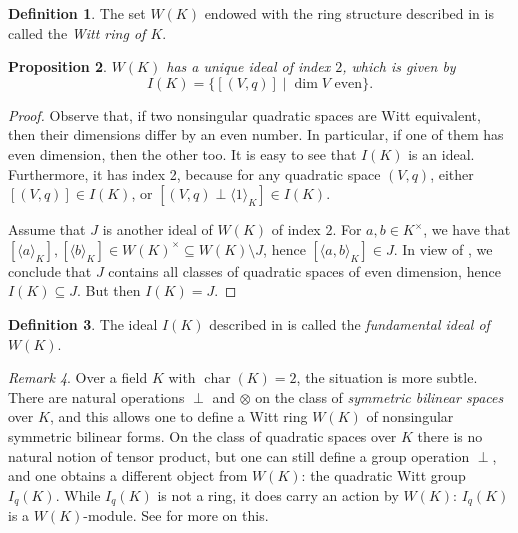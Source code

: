 \documentclass[12pt, leqno, british]{amsart}
\theoremstyle{definition}
\newtheorem{defi}{Definition}[subsection]
\theoremstyle{plain}
\newtheorem{prop}[defi]{Proposition}
\theoremstyle{remark}
\newtheorem{rem}[defi]{Remark}
\DeclareMathOperator{\charac}{char}
\begin{document}
\begin{defi}
The set $W(K)$ endowed with the ring structure described in  is called the \emph{Witt ring of $K$}.
\end{defi}
\begin{prop}\label{P:fundamental-ideal}
$W(K)$ has a unique ideal of index $2$, which is given by
$$ I(K) = \lbrace [(V, q)] \mid \dim V \text{ even} \rbrace.$$
\end{prop}
\begin{proof}
Observe that, if two nonsingular quadratic spaces are Witt equivalent, then their dimensions differ by an even number.
In particular, if one of them has even dimension, then the other too.
It is easy to see that $I(K)$ is an ideal.
Furthermore, it has index 2, because for any quadratic space $(V, q)$, either $[(V, q)] \in I(K)$, or $[(V, q) \perp \langle 1 \rangle_K] \in I(K)$.

Assume that $J$ is another ideal of $W(K)$ of index $2$.
For $a, b \in K^\times$, we have that $[\langle a \rangle_K], [\langle b \rangle_K] \in W(K)^\times \subseteq W(K) \setminus J$, hence $[\langle a, b \rangle_K] \in J$.
In view of , we conclude that $J$ contains all classes of quadratic spaces of even dimension, hence $I(K) \subseteq J$.
But then $I(K) = J$.
\end{proof}
\begin{defi}
The ideal $I(K)$ described in  is called the \emph{fundamental ideal of $W(K)$}.
\end{defi}

\begin{rem}
Over a field $K$ with $\charac(K) = 2$, the situation is more subtle. There are natural operations $\perp$ and $\otimes$ on the class of \textit{symmetric bilinear spaces} over $K$, and this allows one to define a Witt ring $W(K)$ of nonsingular symmetric bilinear forms.
On the class of quadratic spaces over $K$ there is no natural notion of tensor product, but one can still define a group operation $\perp$, and one obtains a different object from $W(K)$: the quadratic Witt group $I_q(K)$.
While $I_q(K)$ is not a ring, it does carry an action by $W(K)$: $I_q(K)$ is a $W(K)$-module.
See \autocite[Sections 2, 8]{ElmanKarpenkoMerkurjev} for more on this.
\end{rem}
\end{document}
